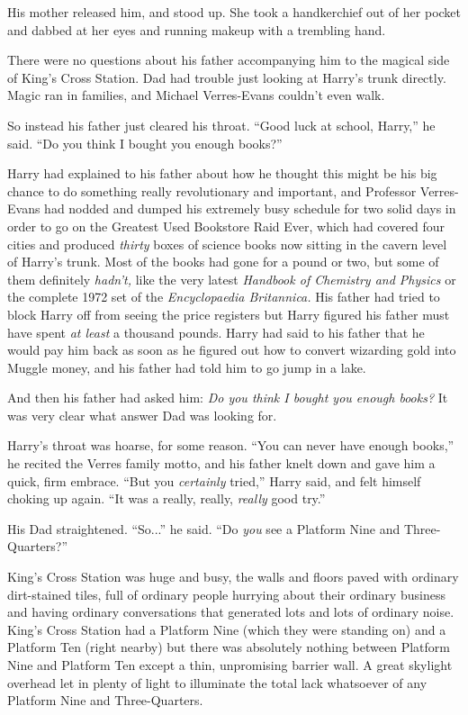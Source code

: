 His mother released him, and stood up. She took a handkerchief out of her pocket and dabbed at her eyes and running makeup with a trembling hand.

There were no questions about his father accompanying him to the magical side of King’s Cross Station. Dad had trouble just looking at Harry’s trunk directly. Magic ran in families, and Michael Verres-Evans couldn’t even walk.

So instead his father just cleared his throat. “Good luck at school, Harry,” he said. “Do you think I bought you enough books?”

Harry had explained to his father about how he thought this might be his big chance to do something really revolutionary and important, and Professor Verres-Evans had nodded and dumped his extremely busy schedule for two solid days in order to go on the Greatest Used Bookstore Raid Ever, which had covered four cities and produced \emph{thirty} boxes of science books now sitting in the cavern level of Harry’s trunk. Most of the books had gone for a pound or two, but some of them definitely \emph{hadn’t,} like the very latest \emph{Handbook of Chemistry and Physics} or the complete 1972 set of the \emph{Encyclopaedia Britannica.} His father had tried to block Harry off from seeing the price registers but Harry figured his father must have spent \emph{at least} a thousand pounds. Harry had said to his father that he would pay him back as soon as he figured out how to convert wizarding gold into Muggle money, and his father had told him to go jump in a lake.

And then his father had asked him: \emph{Do you think I bought you enough books?} It was very clear what answer Dad was looking for.

Harry’s throat was hoarse, for some reason. “You can never have enough books,” he recited the Verres family motto, and his father knelt down and gave him a quick, firm embrace. “But you \emph{certainly} tried,” Harry said, and felt himself choking up again. “It was a really, really, \emph{really} good try.”

His Dad straightened. “So...” he said. “Do \emph{you} see a Platform Nine and Three-Quarters?”

King’s Cross Station was huge and busy, the walls and floors paved with ordinary dirt-stained tiles, full of ordinary people hurrying about their ordinary business and having ordinary conversations that generated lots and lots of ordinary noise. King’s Cross Station had a Platform Nine (which they were standing on) and a Platform Ten (right nearby) but there was absolutely nothing between Platform Nine and Platform Ten except a thin, unpromising barrier wall. A great skylight overhead let in plenty of light to illuminate the total lack whatsoever of any Platform Nine and Three-Quarters.

